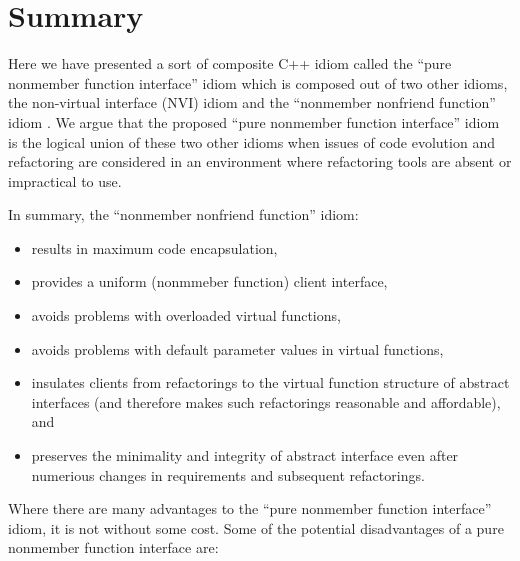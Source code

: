 \documentclass[pdf,ps2pdf,11pt]{SANDreport}
\begin{document}
%
\section{Summary}
%

Here we have presented a sort of composite C++ idiom called the ``pure
nonmember function interface'' idiom which is composed out of two other
idioms, the non-virtual interface (NVI) idiom {}\cite[Item
39]{C++CodingStandards05} and the ``nonmember nonfriend function'' idiom
{}\cite[Item 44]{C++CodingStandards05}.  We argue that the proposed ``pure
nonmember function interface'' idiom is the logical union of these two other
idioms when issues of code evolution and refactoring are considered in an
environment where refactoring tools are absent or impractical to use.

In summary, the ``nonmember nonfriend function'' idiom:

\begin{itemize}

{}\item results in maximum code encapsulation,

{}\item provides a uniform (nonmmeber function) client interface,

{}\item avoids problems with overloaded virtual functions,

{}\item avoids problems with default parameter values in virtual functions,

{}\item insulates clients from refactorings to the virtual function structure
of abstract interfaces (and therefore makes such refactorings reasonable and
affordable), and

{}\item preserves the minimality and integrity of abstract interface even
after numerious changes in requirements and subsequent refactorings.

\end{itemize}

Where there are many advantages to the ``pure nonmember function interface''
idiom, it is not without some cost.  Some of the potential disadvantages of a
pure nonmember function interface are:
\end{document}

